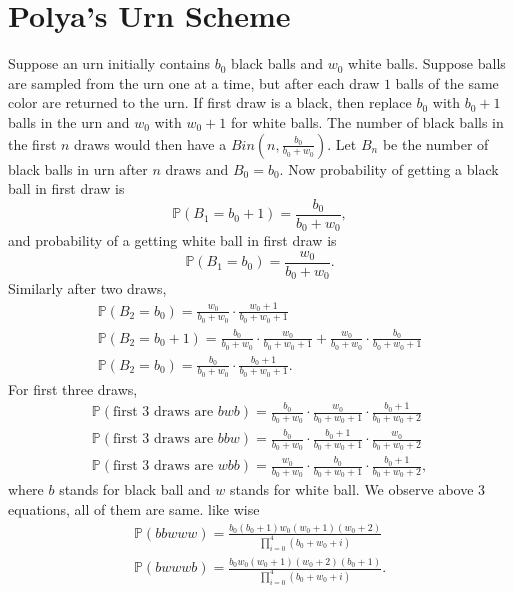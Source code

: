 \documentclass[a4paper,10pt,english]{article}
\begin{document}
\section{Polya's Urn Scheme}
Suppose an urn initially contains $b_0$ black balls and $w_0$ white balls. Suppose balls are sampled from the urn one at a time, but after each draw $1$ balls of the same color are returned to the urn. If first draw is a black, then replace $b_0$ with $b_0+1$ balls in the urn and $w_0$ with $w_0+1$ for white balls. The number of black balls in the first $n$ draws would then have a $Bin(n,\frac{b_0}{b_0+w_0})$.
Let $B_n$ be the number of black balls in urn after $n$ draws and $B_0 = b_0$. Now probability of getting a black ball in first draw is
 \begin{equation*}
\mathbb{P}(B_1=b_0+1)= \frac{b_0}{b_0+w_0},
\end{equation*}
and probability of a getting white ball in first draw is
 \begin{equation*}
\mathbb{P}(B_1=b_0)= \frac{w_0}{b_0+w_0}.
\end{equation*}
Similarly after two draws,
 \begin{align*}
\mathbb{P}(B_2=b_0)= \frac{w_0}{b_0+w_0} \cdot \frac{w_0+1}{b_0+w_0+1}\\
\mathbb{P}(B_2=b_0+1)= \frac{b_0}{b_0+w_0} \cdot \frac{w_0}{b_0+w_0+1}+\frac{w_0}{b_0+w_0} \cdot \frac{b_0}{b_0+w_0+1}\\
\mathbb{P}(B_2=b_0)= \frac{b_0}{b_0+w_0} \cdot \frac{b_0+1}{b_0+w_0+1}.
\end{align*}
For first three draws,
 \begin{align*}
\mathbb{P}(\text{first 3 draws are } bwb)= \frac{b_0}{b_0+w_0} \cdot \frac{w_0}{b_0+w_0+1} \cdot \frac{b_0+1}{b_0+w_0+2}\\
\mathbb{P}(\text{first 3 draws are } bbw)= \frac{b_0}{b_0+w_0} \cdot \frac{b_0+1}{b_0+w_0+1} \cdot \frac{w_0}{b_0+w_0+2}\\
\mathbb{P}(\text{first 3 draws are } wbb)= \frac{w_0}{b_0+w_0} \cdot \frac{b_0}{b_0+w_0+1} \cdot \frac{b_0+1}{b_0+w_0+2},
\end{align*}
where $b$ stands for black ball and $w$ stands for white ball. We observe above 3 equations, all of them are same. like wise
 \begin{align*}
\mathbb{P}(bbwww)= \frac{b_0(b_0+1)w_0(w_0+1)(w_0+2)}{\prod_{i=0}^4 (b_0+w_0+i)}\\
\mathbb{P}(bwwwb)= \frac{b_0w_0(w_0+1)(w_0+2)(b_0+1)}{\prod_{i=0}^4 (b_0+w_0+i)}.
\end{align*}
\end{document}
